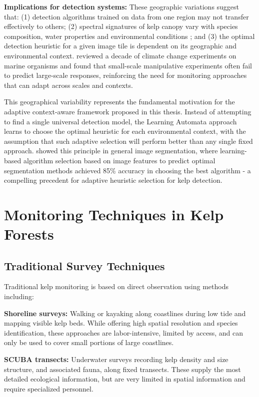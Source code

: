 \documentclass[12pt,oneside]{book}
\begin{document}
\textbf{Implications for detection systems:} These geographic variations suggest that: (1) detection algorithms trained on data from one region may not transfer effectively to others; (2) spectral signatures of kelp canopy vary with species composition, water properties and environmental conditions \citep{Turner2003}; and (3) the optimal detection heuristic for a given image tile is dependent on its geographic and environmental context. \citet{Wernberg2012} reviewed a decade of climate change experiments on marine organisms and found that small-scale manipulative experiments often fail to predict large-scale responses, reinforcing the need for monitoring approaches that can adapt across scales and contexts.

This geographical variability represents the fundamental motivation for the adaptive context-aware framework proposed in this thesis. Instead of attempting to find a single universal detection model, the Learning Automata approach learns to choose the optimal heuristic for each environmental context, with the assumption that such adaptive selection will perform better than any single fixed approach. \citet{Yong2005} showed this principle in general image segmentation, where learning-based algorithm selection based on image features to predict optimal segmentation methods achieved 85\% accuracy in choosing the best algorithm - a compelling precedent for adaptive heuristic selection for kelp detection.

\section{Monitoring Techniques in Kelp Forests}
\label{sec:lit-monitoring}

\subsection{Traditional Survey Techniques}
\label{subsec:traditional-surveys}

Traditional kelp monitoring is based on direct observation using methods including:

\textbf{Shoreline surveys:} Walking or kayaking along coastlines during low tide and mapping visible kelp beds. While offering high spatial resolution and species identification, these approaches are labor-intensive, limited by access, and can only be used to cover small portions of large coastlines.

\textbf{SCUBA transects:} Underwater surveys recording kelp density and size structure, and associated fauna, along fixed transects. These supply the most detailed ecological information, but are very limited in spatial information and require specialized personnel.
\end{document}
